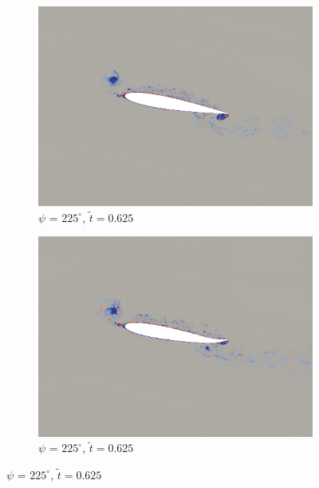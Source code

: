 \begin{figure}[H]
	\begin{subfigure}[b]{0.4\textwidth}
		\centering
		\includegraphics[width=1\textwidth]{figures/mu_2pt0/vorticity/baseline/phase_225.png}
		\caption{ $\psi$ = $225^\circ$, $\tilde{t}=0.625$}
		\label{fig:mu_2pt0_baseline_psi225}
	\end{subfigure}
	\begin{subfigure}[b]{0.4\textwidth}
		\centering
		\includegraphics[width=1\textwidth]{figures/mu_2pt0/vorticity/AC/phase_225.png}
		\caption{ $\psi$ = $225^\circ$,  $\tilde{t}=0.625$}
		\label{fig:mu_2pt0_AC_psi225}
	\end{subfigure}
	
	
	

\end{figure}
